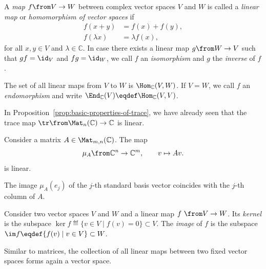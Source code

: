 \documentclass[a4paper,oneside, 12pt]{amsart}
\begin{document}
\begin{definition}\label{def:linear-maps}
  A \emph{map} \( f \from V \to W \) between complex vector spaces \(V\) and \(W\) is called  a \emph{linear map} or \emph{homomorphism of vector spaces } if
  \begin{subequations}
    \begin{align}
      f(x + y) &= f(x) + f(y), \\
      f(\lambda x) &= \lambda f(x),
    \end{align}
  \end{subequations}
  for all \( x, y \in V \) and \( \lambda \in \mathbb{C} \).
  In case there exists a linear map \(g \from W \to V\) such that \(g f = \id_{V} \) and \(f g = \id_{W}\), we call \(f\) an \emph{isomorphism} and \(g\) the \emph{inverse} of \(f\).

  The set of all linear maps from \( V \) to \( W \) is \(\Hom_{ \mathbb{C}}(V, W) \).
  If \(V=W\), we call \(f\) an \emph{endomorphism} and write \(\End_{ \mathbb{C}}(V) \eqdef \Hom_{ \mathbb{C}}(V,V)\).
\end{definition}

In Proposition~\ref{prop:basic-properties-of-trace}, we have already seen that the trace map \(\tr \from \Mat_{n}( \mathbb{C}) \to \mathbb{C}\) is linear.

\begin{example}\label{ex:matrices-lead-to-linear-multiplication}
  Consider a matrix \(A\in \Mat_{m,n}( \mathbb{C})\).
  The map
  \begin{equation}
    \mu_{A} \from \mathbb{C}^{n}\to \mathbb{C}^{m}, \qquad v \mapsto Av.
  \end{equation}
  is linear.

  The image \(\mu_{A}(e_{j})\) of the \(j\)-th standard basis vector coincides with the \(j\)-th column of \(A\).
\end{example}

\begin{definition}\label{def:image-and-kernel}
  Consider two vector spaces \(V\) and \(W\) and a linear map \(f\ \from V \to W\).
  Its \emph{kernel} is the subspace \(\ker f \eqdef \{v \in V \mid f(v) = 0\} \subset V\).
  The \emph{image} of \(f\) is the subspace \(\im f \eqdef \{f(v) \mid v\in V\} \subset W\).
\end{definition}

Similar to matrices, the collection of all linear maps between two fixed vector spaces forms again a vector space.
\end{document}
